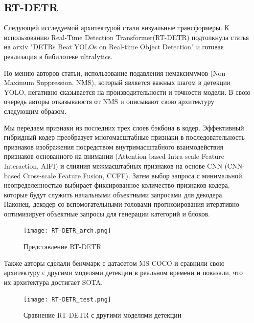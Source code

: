 \documentclass[../document.tex]{subfiles}
\begin{document}
	\subsection{RT-DETR}
		\par Следующей исследуемой архитектурой стали визуальные трансформеры. К использованию Real-Time Detection Transformer(RT-DETR) подтолкнула статья на arxiv "DETRs Beat YOLOs on Real-time Object Detection" и готовая реализация в бибилотеке ultralytics.
		\par По мению авторов статьи, использование подавления немаксимумов (Non-Maximum Suppression, NMS), который является важных шагом в детекции YOLO, негативно сказывается на производительности и точности модели. В свою очередь авторы отказываюстя от NMS и описывают свою архитектуру следующим образом.
		\par Мы передаем признаки из последних трех слоев бэкбона в кодер. Эффективный гибридный кодер преобразует многомасштабные признаки в последовательность признаков изображения посредством внутримасштабного взаимодействия признаков основанного на внимании (Attention based Intra-scale Feature Interaction, AIFI) и слияния межмасштабных признаков на основе CNN (CNN-based Cross-scale Feature Fusion, CCFF). Затем выбор запроса с минимальной неопределенностью выбирает фиксированное количество признаков кодера, которые будут служить начальными объектными запросами для декодера. Наконец, декодер со вспомогательными головами прогнозирования итеративно оптимизирует объектные запросы для генерации категорий и блоков.
		\begin{figure}[H]
			\centering
			\texttt{[image: RT-DETR\_arch.png]}
			\caption{Представление RT-DETR}
		\end{figure}
		
		\par Также авторы сделали бенчмарк с датасетом MS COCO и сравнили свою архитектуру с другими моделями детекции в реальном времени и показали, что их архитектура достигает SOTA.
		\begin{figure}[H]
			\centering
			\texttt{[image: RT-DETR\_test.png]}
			\caption{Сравнение RT-DETR с другими моделями детекции}
		\end{figure}
	
\end{document}
